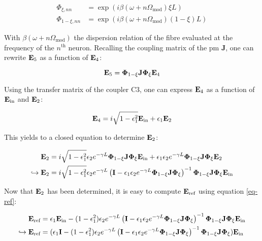 \begin{align}
	\Phi_{\xi,nn} &= \exp{ \left(i \beta (\omega+n\Omega_{\text{mod}}) \xi L \right)} \nonumber \\
	\Phi_{1-\xi,nn} &= \exp{ \left(i \beta (\omega+n\Omega_{\text{mod}}) (1-\xi) L \right)}
\end{align}

With $\beta (\omega+n\Omega_{\text{mod}})$ the dispersion relation of the fibre evaluated at the frequency of the $n^{\text{th}}$ neuron. Recalling the coupling matrix of the \gls{pm} $\mathbf{J}$, one can rewrite $\mathbf{E}_{\text{5}}$ as a function of $\mathbf{E}_{\text{4}}$:

\begin{equation}
	\mathbf{E}_{\text{5}} = \mathbf{\Phi}_{1-\xi} \mathbf{J} \mathbf{\Phi}_\xi \mathbf{E}_{\text{4}}
\end{equation}

Using the transfer matrix of the coupler C3, one can express $\mathbf{E}_{\text{4}}$ as a function of $\mathbf{E}_{\text{in}}$ and $\mathbf{E}_{\text{2}}$:

\begin{equation}
	\mathbf{E}_{\text{4}} = i\sqrt{1-\epsilon_1^2} \mathbf{E}_{\text{in}} + \epsilon_1 \mathbf{E}_{\text{2}}
\end{equation}

This yields to a closed equation to determine $\mathbf{E}_{\text{2}}$:

\begin{align}
	\mathbf{E}_{\text{2}} &= i\sqrt{1-\epsilon_1^2} \epsilon_2 e^{-\gamma L} \mathbf{\Phi}_{1-\xi} \mathbf{J} \mathbf{\Phi}_\xi \mathbf{E}_{\text{in}} + \epsilon_1 \epsilon_2 e^{-\gamma L} \mathbf{\Phi}_{1-\xi} \mathbf{J} \mathbf{\Phi}_\xi \mathbf{E}_{\text{2}} \nonumber \\
	\hookrightarrow \mathbf{E}_{\text{2}} &= i \sqrt{1-\epsilon_1^2} \epsilon_2 e^{-\gamma L} \left( \mathbf{I} - \epsilon_1 \epsilon_2 e^{- \gamma L} \mathbf{\Phi}_{1-\xi} \mathbf{J} \mathbf{\Phi}_\xi \right)^{-1} \mathbf{\Phi}_{1-\xi} \mathbf{J} \mathbf{\Phi}_\xi \mathbf{E}_{\text{in}}
\end{align}

Now that $\mathbf{E}_{\text{2}}$ has been determined, it is easy to compute $\mathbf{E}_{\text{ref}}$ using equation \eqref{eq-ref}:

\begin{align}
	\mathbf{E}_{\text{ref}} &= \epsilon_1 \mathbf{E}_{\text{in}} - (1-\epsilon_1^2) \epsilon_2 e^{-\gamma L} \left( \mathbf{I} - \epsilon_1 \epsilon_2 e^{- \gamma L} \mathbf{\Phi}_{1-\xi} \mathbf{J} \mathbf{\Phi}_\xi \right)^{-1} \mathbf{\Phi}_{1-\xi} \mathbf{J} \mathbf{\Phi}_\xi \mathbf{E}_{\text{in}} \nonumber \\
	\hookrightarrow \mathbf{E}_{\text{ref}} &= (\epsilon_1 \mathbf{I} - (1-\epsilon_1^2) \epsilon_2 e^{-\gamma L} \left( \mathbf{I} - \epsilon_1 \epsilon_2 e^{- \gamma L} \mathbf{\Phi}_{1-\xi} \mathbf{J} \mathbf{\Phi}_\xi \right)^{-1} \mathbf{\Phi}_{1-\xi} \mathbf{J} \mathbf{\Phi}_\xi) \mathbf{E}_{\text{in}}
\end{align}

